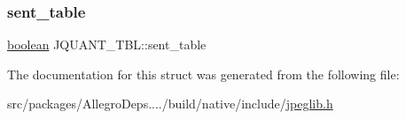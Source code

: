 \subsubsection{\texorpdfstring{sent\+\_\+table}{sent\_table}}
{\footnotesize\ttfamily \hyperlink{jconfig_8h_a7670a4e8a07d9ebb00411948b0bbf86d}{boolean} J\+Q\+U\+A\+N\+T\+\_\+\+T\+B\+L\+::sent\+\_\+table}



The documentation for this struct was generated from the following file\+:\begin{DoxyCompactItemize}
\item 
src/packages/\+Allegro\+Deps..../build/native/include/\hyperlink{jpeglib_8h}{jpeglib.\+h}\end{DoxyCompactItemize}
